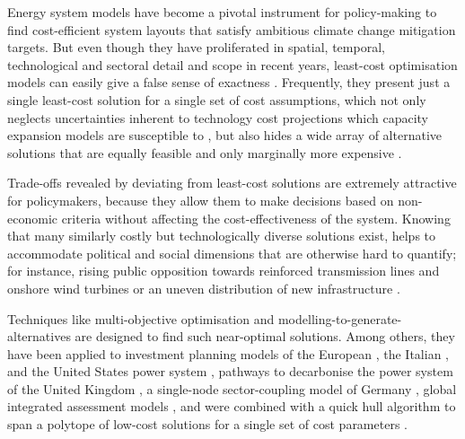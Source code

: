 
Energy system models have become a pivotal instrument for policy-making to find
cost-efficient system layouts that satisfy ambitious climate change mitigation
targets. But even though they have proliferated in spatial, temporal,
technological and sectoral detail and scope in recent years, least-cost
optimisation models can easily give a false sense of exactness
\cite{Trutnevyte2016, pye_modelling_2020}. Frequently, they present just a
single least-cost solution for a single set of cost assumptions, which not only
neglects uncertainties inherent to technology cost projections which capacity
expansion models are susceptible to \cite{trondle_trade-offs_2020, yue_review_2018,
pye_assessing_2018}, but also hides a wide array of alternative solutions that
are equally feasible and only marginally more expensive \cite{nearoptimal,
lombardi_policy_2020, sasse_regional_2020}.


Trade-offs revealed by deviating from least-cost solutions are extremely
attractive for policymakers, because they allow them to make decisions based on
non-economic criteria without affecting the cost-effectiveness of the system.
Knowing that many similarly costly but technologically diverse solutions exist,
helps to accommodate political and social dimensions that are otherwise hard to
quantify; for instance, rising public opposition towards reinforced transmission
lines and onshore wind turbines or an uneven distribution of new infrastructure
\cite{mccollum_energy_2020,sasse_regional_2020,schlachtberger_cost_2018}.


Techniques like multi-objective optimisation and
modelling-to-generate-alternatives are designed to find such near-optimal
solutions. Among others, they have been applied to investment planning models of
the European \cite{nearoptimal}, the Italian
\cite{lombardi_policy_2020}, and the United States power system
\cite{DeCarolis2016}, pathways to decarbonise the power system of the United
Kingdom \cite{Li2017}, a single-node sector-coupling model of Germany
\cite{nacken_integrated_2019}, global integrated assessment models
\cite{Price2017}, and were combined with a quick hull algorithm to span a
polytope of low-cost solutions for a single set of cost parameters
\cite{pedersen_modeling_2020}.


